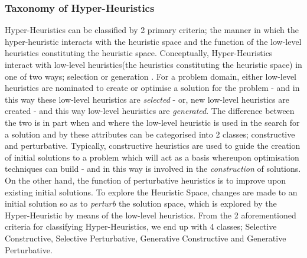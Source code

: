 \documentclass[a4paper,12pt]{article}
\begin{document}
        \subsubsection{Taxonomy of Hyper-Heuristics}
            \par{Hyper-Heuristics can be classified by 2 primary criteria; the manner in which the hyper-heuristic interacts with the heuristic space and the function of the low-level heuristics constituting the heuristic space.\newline 
            \newline
            Conceptually, Hyper-Heuristics interact with low-level heuristics(the heuristics constituting the heuristic space) in one of two ways; selection or  generation \cite{hhsoa}. For a problem domain, either low-level heuristics are nominated to create or optimise a solution for the problem - and in this way these low-level heuristics are \textit{selected} - or, new low-level heuristics are created - and this way low-level heuristics are \textit{generated}. \newline
            \newline  
            The difference between the two is in part when and where the low-level heuristic is used in the search for a solution and by these attributes can be categorised into 2 classes; constructive and perturbative\cite{hhsoa}.\newline
            \newline
            Typically, constructive heuristics are used to guide the creation of initial solutions to a problem which will act as a basis whereupon optimisation techniques can build - and in this way is involved in the \textit{construction} of solutions.\newline
            \newline
            On the other hand, the function of perturbative heuristics is to improve upon existing initial solutions. To explore the Heuristic Space, changes are made to an initial solution so as to \textit{perturb} the solution space, which is explored by the Hyper-Heuristic by means of the low-level heuristics. \newline
            \newline
            From the 2 aforementioned criteria for classifying Hyper-Heuristics, we end up with 4 classes; Selective Constructive, Selective Perturbative, Generative Constructive and Generative Perturbative.
            } 
\end{document}
